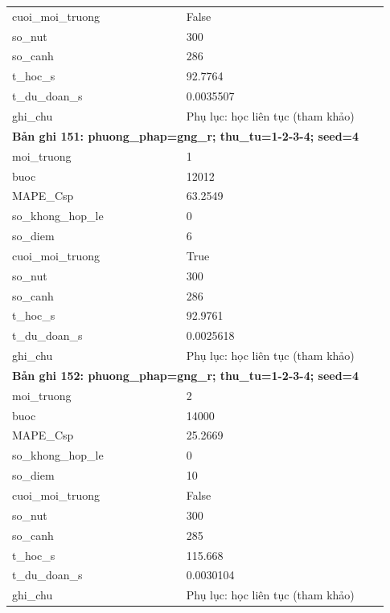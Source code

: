 \begin{longtable}{p{0.43\linewidth}p{0.50\linewidth}}
cuoi\_\allowbreak moi\_\allowbreak truong & False \\
so\_\allowbreak nut & 300 \\
so\_\allowbreak canh & 286 \\
t\_\allowbreak hoc\_\allowbreak s & 92.7764 \\
t\_\allowbreak du\_\allowbreak doan\_\allowbreak s & 0.0035507 \\
ghi\_\allowbreak chu & Phụ lục: học liên tục (tham khảo) \\
\midrule
\multicolumn{2}{p{0.95\linewidth}}{\textbf{Bản ghi 151: phuong\_phap=gng\_r; thu\_tu=1-2-3-4; seed=4}} \\
moi\_\allowbreak truong & 1 \\
buoc & 12012 \\
MAPE\_\allowbreak Csp & 63.2549 \\
so\_\allowbreak khong\_\allowbreak hop\_\allowbreak le & 0 \\
so\_\allowbreak diem & 6 \\
cuoi\_\allowbreak moi\_\allowbreak truong & True \\
so\_\allowbreak nut & 300 \\
so\_\allowbreak canh & 286 \\
t\_\allowbreak hoc\_\allowbreak s & 92.9761 \\
t\_\allowbreak du\_\allowbreak doan\_\allowbreak s & 0.0025618 \\
ghi\_\allowbreak chu & Phụ lục: học liên tục (tham khảo) \\
\midrule
\multicolumn{2}{p{0.95\linewidth}}{\textbf{Bản ghi 152: phuong\_phap=gng\_r; thu\_tu=1-2-3-4; seed=4}} \\
moi\_\allowbreak truong & 2 \\
buoc & 14000 \\
MAPE\_\allowbreak Csp & 25.2669 \\
so\_\allowbreak khong\_\allowbreak hop\_\allowbreak le & 0 \\
so\_\allowbreak diem & 10 \\
cuoi\_\allowbreak moi\_\allowbreak truong & False \\
so\_\allowbreak nut & 300 \\
so\_\allowbreak canh & 285 \\
t\_\allowbreak hoc\_\allowbreak s & 115.668 \\
t\_\allowbreak du\_\allowbreak doan\_\allowbreak s & 0.0030104 \\
ghi\_\allowbreak chu & Phụ lục: học liên tục (tham khảo) \\

\end{longtable}
